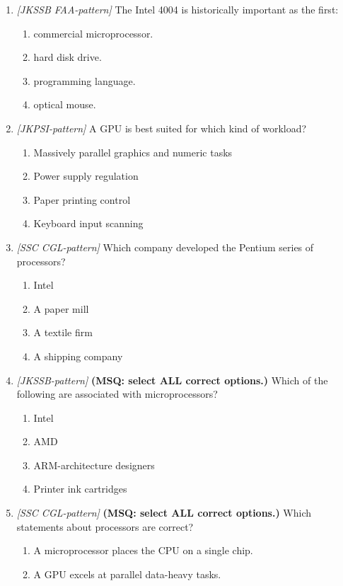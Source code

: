 \begin{enumerate}[label=\textbf{Q\arabic*.}, leftmargin=*]
\item \textit{[JKSSB FAA-pattern]} The Intel 4004 is historically important as the first:
  \begin{enumerate}[label=\Alph*.]
    \item commercial microprocessor.
    \item hard disk drive.
    \item programming language.
    \item optical mouse.
  \end{enumerate}
\item \textit{[JKPSI-pattern]} A GPU is best suited for which kind of workload?
  \begin{enumerate}[label=\Alph*.]
    \item Massively parallel graphics and numeric tasks
    \item Power supply regulation
    \item Paper printing control
    \item Keyboard input scanning
  \end{enumerate}
\item \textit{[SSC CGL-pattern]} Which company developed the Pentium series of processors?
  \begin{enumerate}[label=\Alph*.]
    \item Intel
    \item A paper mill
    \item A textile firm
    \item A shipping company
  \end{enumerate}
\item \textit{[JKSSB-pattern]} \textbf{(MSQ: select ALL correct options.)} Which of the following are associated with microprocessors?
  \begin{enumerate}[label=\Alph*.]
    \item Intel
    \item AMD
    \item ARM-architecture designers
    \item Printer ink cartridges
  \end{enumerate}
\item \textit{[SSC CGL-pattern]} \textbf{(MSQ: select ALL correct options.)} Which statements about processors are correct?
  \begin{enumerate}[label=\Alph*.]
    \item A microprocessor places the CPU on a single chip.
    \item A GPU excels at parallel data-heavy tasks.

\end{enumerate}
\end{enumerate}
